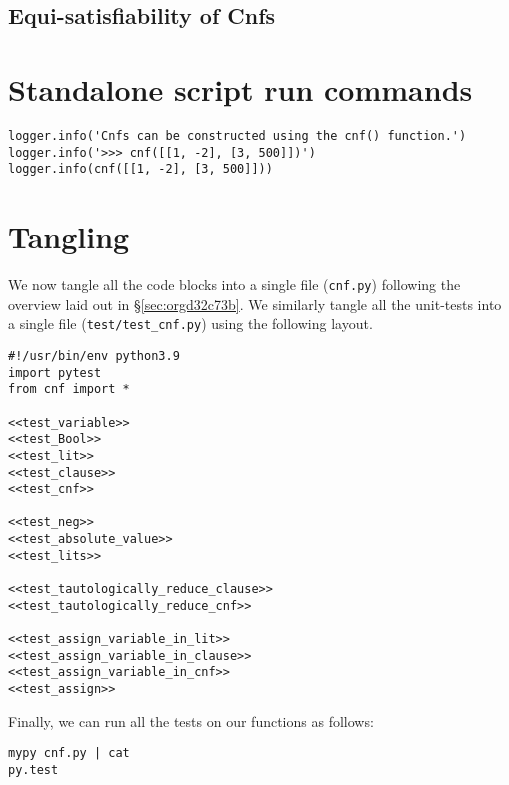 \documentclass[11pt]{article}
\begin{document}
\subsection{Equi-satisfiability of Cnfs}
\label{sec:org24e2fdc}

\section{Standalone script run commands}
\label{sec:org682198f}
\begin{verbatim}
logger.info('Cnfs can be constructed using the cnf() function.')
logger.info('>>> cnf([[1, -2], [3, 500]])')
logger.info(cnf([[1, -2], [3, 500]]))
\end{verbatim}

\section{Tangling}
\label{sec:orgd7f624b}
We now tangle all the code blocks into a single file (\texttt{cnf.py})
following the overview laid out in \S \ref{sec:orgd32c73b}.
We similarly tangle all the unit-tests into a single file
(\texttt{test/test\_cnf.py}) using the following layout.
\begin{verbatim}
#!/usr/bin/env python3.9
import pytest
from cnf import *

<<test_variable>>
<<test_Bool>>
<<test_lit>>
<<test_clause>>
<<test_cnf>>

<<test_neg>>
<<test_absolute_value>>
<<test_lits>>

<<test_tautologically_reduce_clause>>
<<test_tautologically_reduce_cnf>>

<<test_assign_variable_in_lit>>
<<test_assign_variable_in_clause>>
<<test_assign_variable_in_cnf>>
<<test_assign>>
\end{verbatim}


Finally, we can run all the tests on our functions as follows:
\begin{verbatim}
mypy cnf.py | cat
py.test
\end{verbatim}
\end{document}
